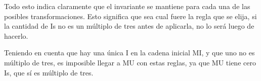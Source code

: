 Todo esto indica claramente que el invariante se mantiene para cada una de las
posibles transformaciones.  Esto significa que sea cual fuere la regla que se
elija, si la cantidad de Is no es un múltiplo de tres antes de aplicarla, no
lo será luego de hacerlo.

Teniendo en cuenta que hay una única I en la cadena inicial MI, y que uno no
es múltiplo de tres, es imposible llegar a MU con estas reglas, ya que MU
tiene cero Is, que sí es múltiplo de tres.

